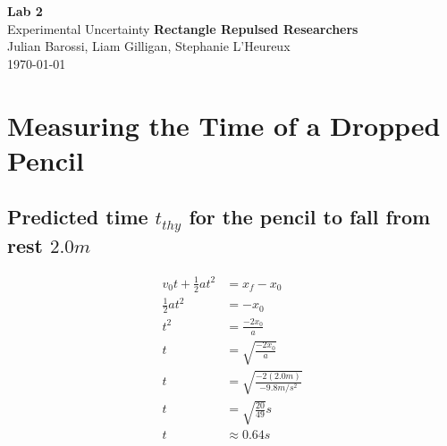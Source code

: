 \documentclass[11pt, letterpaper, includehead]{article}
\begin{document}
  \begin{titlepage} 
    \begin{center}
      \Huge{\textbf{Lab 2}}\\
      \Huge{Experimental Uncertainty}
      \vfill
      \large{\textbf{Rectangle Repulsed Researchers}}\\
      \large{Julian Barossi, Liam Gilligan, Stephanie L'Heureux}\\
      \vspace{0.5cm}
      \normalsize
      \today
    \end{center}
  \end{titlepage}

  \tableofcontents
  \pagebreak %


  \pagestyle{fancy}
  \fancyhead{}

  \section{Measuring the Time of a Dropped Pencil} %
  
  \subsection{Predicted time $t_{thy}$ for the pencil to fall from rest $2.0m$} %

  \begin{align*}
    v_0t + \frac{1}{2}at^2 &= x_f - x_0\\
    \frac{1}{2}at^2 &= -x_0\\
    t^2 &= \frac{-2x_0}{a}\\
    t &= \sqrt{\frac{-2x_0}{a}}\\
    t &= \sqrt{\frac{-2(2.0m)}{-9.8m/s^2}}\\
    t &= \sqrt{\frac{20}{49}}s\\
    t &\approx 0.64s
  \end{align*}
\end{document}
